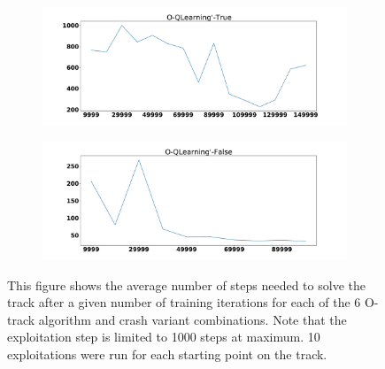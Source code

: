 \documentclass{amsart}
\begin{document}
\begin{figure}
\begin{subfigure}[t]{0.3\textwidth}
    \end{subfigure}
    \begin{subfigure}[t]{0.3\textwidth}
    \centering
    \includegraphics[width=\textwidth]{Otrack_1_learning_rate.pdf}
    \end{subfigure}
    \begin{subfigure}[t]{0.3\textwidth}
    \centering
    \includegraphics[width=\textwidth]{Otrack_4_learning_rate.pdf}
    \end{subfigure}
    \caption{This figure shows the average number of steps needed to solve the track after a given number of
    training iterations for each of the 6 O-track algorithm and crash variant combinations. Note that the exploitation
    step is limited to 1000 steps at maximum. 10 exploitations were run for each starting point on the track.}
    \end{figure}
\end{document}
